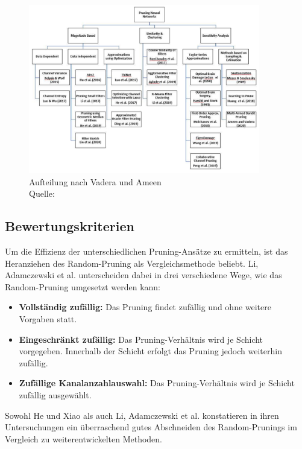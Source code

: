 \begin{figure}[H]
	\centering
	\includegraphics[width=0.9\textwidth]{images/pruning.png}
	\caption{Aufteilung nach Vadera und Ameen\\Quelle: \cite{vadera2022methods}}
	\label{fig:vadera}
\end{figure}


\newpage
\subsection{Bewertungskriterien}

Um die Effizienz der unterschiedlichen Pruning-Ansätze zu ermitteln, ist das
Heranziehen des Random-Pruning als Vergleichsmethode beliebt. Li, Adamczewski
et al. unterscheiden dabei in drei verschiedene Wege, wie das Random-Pruning
umgesetzt werden kann:

\begin{itemize}
	\item \textbf{Vollständig zufällig:} Das Pruning findet zufällig und ohne weitere Vorgaben statt.
	\item \textbf{Eingeschränkt zufällig:} Das Pruning-Verhältnis wird je Schicht vorgegeben. Innerhalb der Schicht erfolgt das Pruning jedoch weiterhin zufällig.
    \item \textbf{Zufällige Kanalanzahlauswahl:} Das Pruning-Verhältnis wird je Schicht zufällig ausgewählt.\autocite[Vgl.][]{li2022random}
\end{itemize}

Sowohl He und Xiao als auch Li, Adamczewski et al. konstatieren in ihren
Untersuchungen ein überraschend gutes Abschneiden des Random-Prunings im
Vergleich zu weiterentwickelten Methoden.\autocites[Vgl.][]{he2023structured}{li2022random}

